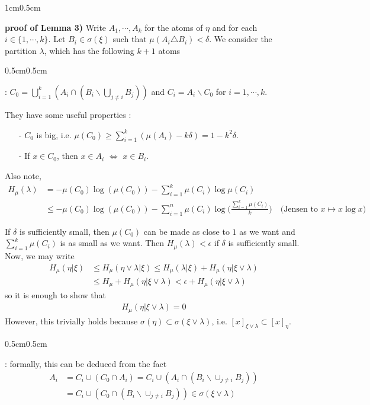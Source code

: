 \documentclass[10pt,a4paper]{report}
\newenvironment{proof}
{\begin{changemargin}{1cm}{0.5cm} 
	}%
	{\end{changemargin}
}
\newenvironment{subproof}
{\begin{changemargin}{0.5cm}{0.5cm}
	}%
	{\end{changemargin}
}
\begin{document}
\begin{proof}
\textbf{proof of Lemma 3)} Write $A_1, \cdots, A_k$ for the atoms of $\eta$ and for each $i \in \{1,\cdots, k\}$. Let $B_i \in \sigma(\xi)$ such that $\mu(A_i \triangle B_i) < \delta$. We consider the partition $\lambda$, which has the following $k+1$ atoms
\begin{subproof}
: $C_0 = \bigcup_{i=1}^k (A_i \cap (B_i \backslash \bigcup_{j\neq i} B_j ) )$ and $C_i = A_i \backslash C_0$ for $i=1, \cdots, k$.

They have some useful properties :
\begin{itemize}
\item[-] $C_{0}$ is big, i.e. $\mu(C_0) \geq \sum_{i=1}^k (\mu(A_i) - k\delta) = 1-k^2 \delta$.
\item[-] If $x\in C_0$, then $x\in A_i$ $\Leftrightarrow$ $x\in B_i$.
\end{itemize}
Also note, 
\begin{align*}
H_{\mu} (\lambda) &= -\mu(C_0) \log (\mu(C_0)) - \sum_{i=1}^k \mu(C_i) \log \mu (C_i) \\
&\leq -\mu(C_0) \log (\mu (C_0)) - \sum_{i=1}^n \mu(C_i) \log \Big( \frac{\sum_{i=1}^k \mu(C_i)}{k} \Big) \quad \text{(Jensen to }x\mapsto x\log x) 
\end{align*}
\end{subproof}
If $\delta$ is sufficiently small, then $\mu(C_0)$ can be made as close to $1$ as we want and $\sum_{i=1}^k \mu(C_i)$ is as small as we want. Then
$H_{\mu}(\lambda) < \epsilon$ if $\delta$ is sufficiently small. Now, we may write
\begin{align*}
H_{\mu}(\eta | \xi) &\leq H_{\mu}(\eta \vee \lambda | \xi) \leq H_{\mu}(\lambda | \xi) + H_{\mu}(\eta | \xi \vee \lambda) \\
& \leq H_{\mu} + H_{\mu}(\eta | \xi \vee \lambda) < \epsilon + H_{\mu}(\eta | \xi \vee \lambda)
\end{align*}
so it is enough to show that
\begin{align*}
H_{\mu}(\eta | \xi \vee \lambda) =0
\end{align*}
However, this trivially holds because $\sigma (\eta) \subset \sigma(\xi \vee \lambda)$, i.e. $[x]_{\xi \vee \lambda} \subset [x]_{\eta}$.
\begin{subproof}
: formally, this can be deduced from the fact \begin{align*}
A_i &= C_i \cup (C_0 \cap A_i) = C_i \cup (A_i \cap (B_i \backslash \cup_{j\neq i} B_j)) \\
&= C_i \cup (C_0 \cap (B_i \backslash \cup_{j\neq i} B_j)) \in \sigma(\xi \vee \lambda)
\end{align*}
\end{subproof}

\eop
\end{proof}
\s
\end{document}
